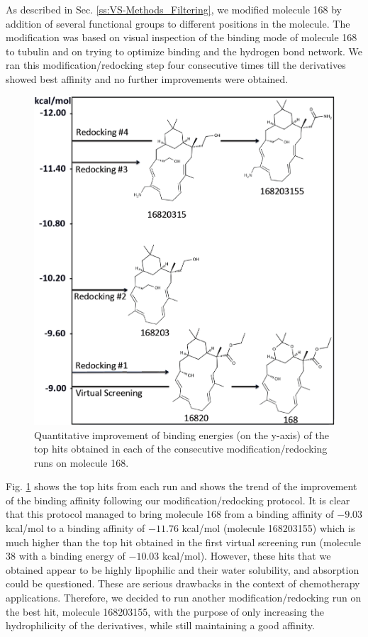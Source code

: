 \documentclass[11pt]{report}
\begin{document}
As described in Sec.
\ref{ss:VS-Methods_Filtering}, 
we modified molecule 168 by addition of several functional groups to different positions in the molecule. The modification was based on visual inspection of the binding mode of molecule 168 to tubulin and on trying to optimize binding and the hydrogen bond network. We ran this modification/redocking step four consecutive times till the derivatives showed best affinity and no further improvements were obtained. 
\begin{figure}
  \centering
  \includegraphics[width=0.6\linewidth]{images/Redock4.png}
  \caption[Quantitative improvement of binding energies]{Quantitative improvement of binding energies (on the y-axis) of the top hits obtained in each of the consecutive modification/redocking runs on molecule 168.}
  \label{f:VS-Redock}
\end{figure}
Fig. \ref{f:VS-Redock} shows the top hits from each run and shows the trend of the improvement of the binding affinity following our modification/redocking protocol. 
It is clear that this protocol managed to bring molecule 168 
from a binding affinity of $-9.03$ kcal/mol to a binding affinity of
$-11.76$ kcal/mol (molecule 168203155) which is much higher than the top hit obtained in the first virtual screening run (molecule
38 with a binding energy of $-10.03$ kcal/mol). However, these hits that we obtained appear to be highly lipophilic and their water solubility, and absorption could be questioned.
These are serious drawbacks in the context of chemotherapy applications. Therefore, we decided to run another modification/redocking run on the best hit, molecule 168203155, with the purpose of only increasing the hydrophilicity of the derivatives, while still maintaining a good affinity.
\end{document}
